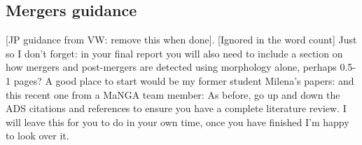 \subsection{Mergers guidance}

[JP guidance from VW: remove this when done].
[Ignored in the word count]
Just so I don't forget: in your final report you will also need to include a section on how mergers and post-mergers are detected using morphology alone, perhaps 0.5-1 pages? A good place to start would be my former student Milena's papers: \citet{2016MNRAS.456.3032P} 
\citet{2018MNRAS.477.1708P} 
\citet{2019NatAs...3..440P} 
and this recent one from a MaNGA team member: \citet{2019ApJ...872...76N} 
As before, go up and down the ADS citations and references to ensure you have a complete literature review. 
I will leave this for you to do in your own time, once you have finished I'm happy to look over it. 
